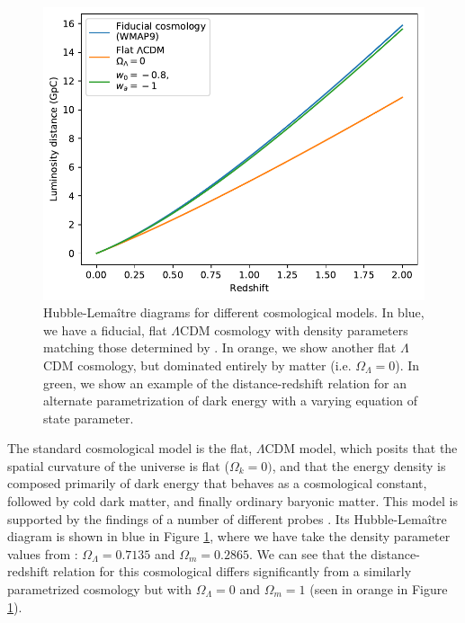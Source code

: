 \begin{figure}[htpb]
    \centering
    \includegraphics{figures/intro/hubble_diagram_examples.pdf}
    \caption{Hubble-Lema\^{i}tre diagrams for different cosmological models. In blue, we have a fiducial, flat $\Lambda$CDM cosmology with density parameters matching those determined by \citet{komatsu_five-year_2009}. In orange, we show another flat $\Lambda$CDM cosmology, but dominated entirely by matter (i.e. $\Omega_\Lambda=0$). In green, we show an example of the distance-redshift relation for an alternate parametrization of dark energy with a varying equation of state parameter.}
    \label{fig:hubble_diagram_examples}
\end{figure}

The standard cosmological model is the flat, $\Lambda$CDM model, which posits that the spatial curvature of the universe is flat ($\Omega_k=0)$, and that the energy density is composed primarily of dark energy that behaves as a cosmological constant, followed by cold dark matter, and finally ordinary baryonic matter. This model is supported by the findings of a number of different probes \citep{planck_collaboration_planck_2016, wittman_detection_2000, eisenstein_detection_2005}. Its Hubble-Lema\^{i}tre diagram is shown in blue in Figure \ref{fig:hubble_diagram_examples}, where we have take the density parameter values from \citet{komatsu_five-year_2009}: $\Omega_\Lambda = 0.7135$ and $\Omega_m = 0.2865$. We can see that the distance-redshift relation for this cosmological differs significantly from a similarly parametrized cosmology but with $\Omega_\Lambda=0$ and $\Omega_m=1$ (seen in orange in Figure \ref{fig:hubble_diagram_examples}).

